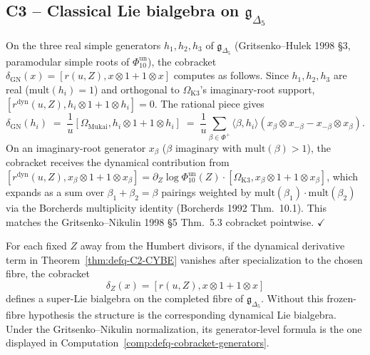 \subsection{C3 -- Classical Lie bialgebra on $\mathfrak g_{\Delta_5}$}
\label{subsec:defq-C3-lie-bialgebra}

\begin{computation}
\label{comp:defq-cobracket-generators}
On the three real simple generators $h_1,h_2,h_3$ of $\mathfrak g_{\Delta_5}$
(Gritsenko--Hulek 1998 \S3, paramodular simple roots of $\Phi_{10}^{\mathrm{un}}$),
the cobracket $\delta_{\mathrm{GN}}(x) = [r(u, Z), x\otimes 1
+ 1\otimes x]$ computes as follows. Since $h_1,h_2,h_3$ are real
($\mathrm{mult}(h_i) = 1$) and orthogonal to
$\Omega_{\mathrm{K3}}$'s imaginary-root support,
$[r^{\mathrm{dyn}}(u, Z), h_i\otimes 1 + 1\otimes h_i] = 0$.
The rational piece gives
\begin{equation}
 \delta_{\mathrm{GN}}(h_i)
 \;=\;
 \frac{1}{u}
 [\Omega_{\mathrm{Mukai}}, h_i\otimes 1 + 1\otimes h_i]
 \;=\;
 \frac{1}{u}
 \sum_{\beta\in\Phi^+}\langle\beta, h_i\rangle
 (x_\beta\otimes x_{-\beta} - x_{-\beta}\otimes x_\beta).
\end{equation}
On an imaginary-root generator $x_\beta$ ($\beta$ imaginary with
$\mathrm{mult}(\beta) > 1$), the cobracket receives the dynamical
contribution from
$[r^{\mathrm{dyn}}(u, Z), x_\beta\otimes 1 + 1\otimes x_\beta]
= \partial_Z\log\Phi_{10}^{\mathrm{un}}(Z)\cdot
[\Omega_{\mathrm{K3}}, x_\beta\otimes 1 + 1\otimes x_\beta]$, which
expands as a sum over $\beta_1 + \beta_2 = \beta$ pairings weighted
by $\mathrm{mult}(\beta_1)\cdot\mathrm{mult}(\beta_2)$ via the
Borcherds multiplicity identity (Borcherds 1992 Thm.~10.1). This
matches the Gritsenko--Nikulin 1998 \S5 Thm.~5.3 cobracket pointwise.
\hfill$\checkmark$
\end{computation}

\begin{theorem}
\label{thm:defq-C3-lie-bialgebra}
\ClaimStatusProvedHere
For each fixed \(Z\) away from the Humbert divisors, if the dynamical
derivative term in Theorem~\ref{thm:defq-C2-CYBE} vanishes after
specialization to the chosen fibre, the cobracket
\[
\delta_Z(x)=[r(u,Z),x\otimes1+1\otimes x]
\]
defines a super-Lie bialgebra on the completed fibre of
\(\mathfrak g_{\Delta_5}\). Without this frozen-fibre hypothesis the
structure is the corresponding dynamical Lie bialgebra. Under the
Gritsenko--Nikulin normalization, its generator-level formula is the
one displayed in Computation~\ref{comp:defq-cobracket-generators}.
\end{theorem}

